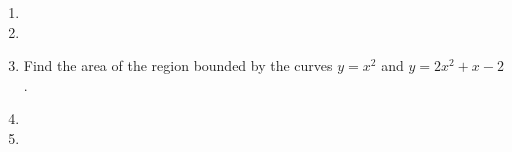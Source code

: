 \begin{enumerate}[ref={\fcProblemRef}]
\item 

\item 

\item \label{problemAreaBetweeny=x^2} Find the area of the region bounded by the curves $y=x^2$ and $y=2x^2+x-2$.



\item 
\item 
\end{enumerate}
